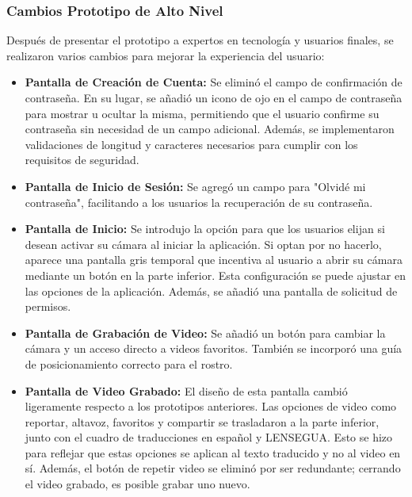 \subsubsection{Cambios Prototipo de Alto Nivel}

Después de presentar el prototipo a expertos en tecnología y usuarios finales, se realizaron varios cambios para mejorar la experiencia del usuario:

\begin{itemize}
    \item \textbf{Pantalla de Creación de Cuenta:} Se eliminó el campo de confirmación de contraseña. En su lugar, se añadió un icono de ojo en el campo de contraseña para mostrar u ocultar la misma, permitiendo que el usuario confirme su contraseña sin necesidad de un campo adicional. Además, se implementaron validaciones de longitud y caracteres necesarios para cumplir con los requisitos de seguridad.
    
    \item \textbf{Pantalla de Inicio de Sesión:} Se agregó un campo para "Olvidé mi contraseña", facilitando a los usuarios la recuperación de su contraseña.
    
    \item \textbf{Pantalla de Inicio:} Se introdujo la opción para que los usuarios elijan si desean activar su cámara al iniciar la aplicación. Si optan por no hacerlo, aparece una pantalla gris temporal que incentiva al usuario a abrir su cámara mediante un botón en la parte inferior. Esta configuración se puede ajustar en las opciones de la aplicación. Además, se añadió una pantalla de solicitud de permisos.
    
    \item \textbf{Pantalla de Grabación de Video:} Se añadió un botón para cambiar la cámara y un acceso directo a videos favoritos. También se incorporó una guía de posicionamiento correcto para el rostro.
    
    \item \textbf{Pantalla de Video Grabado:} El diseño de esta pantalla cambió ligeramente respecto a los prototipos anteriores. Las opciones de video como reportar, altavoz, favoritos y compartir se trasladaron a la parte inferior, junto con el cuadro de traducciones en español y LENSEGUA. Esto se hizo para reflejar que estas opciones se aplican al texto traducido y no al video en sí. Además, el botón de repetir video se eliminó por ser redundante; cerrando el video grabado, es posible grabar uno nuevo.
    

\end{itemize}
